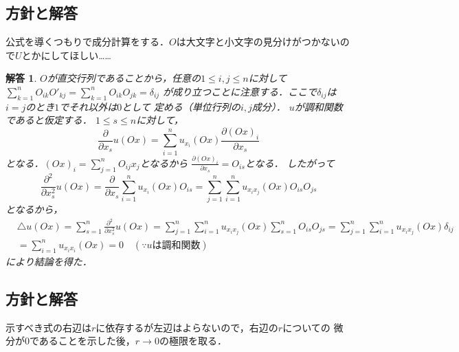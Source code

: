 \documentclass[dvipdfmx,autodetect-engine]{jsarticle}
\newtheorem*{ans}{解答}
\theoremstyle{remark}
\theoremstyle{definition}
\begin{document}
\subsection{方針と解答}
公式を導くつもりで成分計算をする．$O$は大文字と小文字の見分けがつかないので$U$とかにしてほしい……
\begin{ans}
    $O$が直交行列であることから，任意の$1\leq i,j \leq n$に対して
    $\sum_{k=1}^{n} O_{ik} O'_{kj} = \sum_{k=1}^{n} O_{ik} O_{jk} = \delta_{ij}$
    が成り立つことに注意する．ここで$\delta_{ij}$は$i=j$のとき$1$でそれ以外は$0$として
    定める（単位行列の$i,j$成分）．
    $u$が調和関数であると仮定する．
    $1\leq s\leq n$に対して，
    \begin{equation}
        \frac{\partial}{\partial x_{s}} u(Ox)
        = \sum_{i=1}^{n} u_{x_{i}}(Ox) \frac{\partial (Ox)_{i}}{\partial x_{s}}
    \end{equation}
    となる．$(Ox)_{i} = \sum_{j=1}^{n} O_{ij}x_{j}$となるから
    $\frac{\partial (Ox)_{i}}{\partial x_{s}} = O_{is}$となる．
    したがって
    \begin{equation}
        \frac{\partial^{2}}{\partial x_{s}^{2}} u(Ox)
        = \frac{\partial}{\partial x_{s}}
        \sum_{i=1}^{n} u_{x_{i}}(Ox) O_{is} 
        = \sum_{j=1}^{n} \sum_{i=1}^{n} u_{x_{i}x_{j}}(Ox) O_{is} O_{js}
    \end{equation}
    となるから，
    \begin{align}
        &\triangle u(Ox) = \sum_{s=1}^{n}  \frac{\partial^{2}}{\partial x_{s}^{2}} u(Ox)
        = \sum_{j=1}^{n} \sum_{i=1}^{n} u_{x_{i}x_{j}}(Ox) \sum_{s=1}^{n}O_{is} O_{js}
        = \sum_{j=1}^{n} \sum_{i=1}^{n} u_{x_{i}x_{j}}(Ox) \delta_{ij} \\
        &= \sum_{i=1}^{n} u_{x_{i}x_{i}}(Ox) = 0\quad(\because u\text{は調和関数})
    \end{align}
    により結論を得た．
\end{ans}


\subsection{方針と解答}
示すべき式の右辺は$r$に依存するが左辺はよらないので，右辺の$r$についての
微分が$0$であることを示した後，$r \to 0$の極限を取る．
\end{document}
